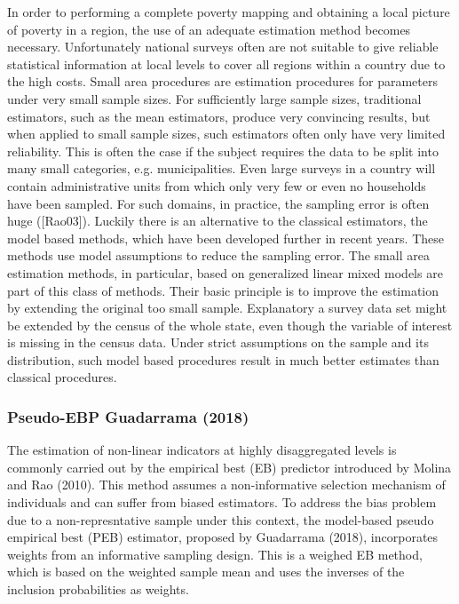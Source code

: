 \documentclass[a4paper, 11pt]{article}
\begin{document}
In order to performing a complete poverty mapping and obtaining a local picture of
poverty in a region, the use of an adequate estimation method becomes necessary.
Unfortunately national surveys often are not suitable to give reliable statistical information
at local levels to cover all regions within a country due to the high costs.
Small area procedures are estimation procedures for parameters under very small
sample sizes. For sufficiently large sample sizes, traditional estimators, such as the
mean estimators, produce very convincing results, but when applied to small sample
sizes, such estimators often only have very limited reliability. This is often the case
if the subject requires the data to be split into many small categories, e.g. municipalities.
Even large surveys in a country will contain administrative units from
which only very few or even no households have been sampled. For such domains, in
practice, the sampling error is often huge ([Rao03]). Luckily there is an alternative
to the classical estimators, the model based methods, which have been developed
further in recent years. These methods use model assumptions to reduce the sampling
error. The small area estimation methods, in particular, based on generalized
linear mixed models are part of this class of methods. Their basic principle is to
improve the estimation by extending the original too small sample. Explanatory a
survey data set might be extended by the census of the whole state, even though
the variable of interest is missing in the census data. Under strict assumptions on the sample and its distribution, such model based procedures result
in much better estimates than classical procedures.
    
\subsubsection{Pseudo-EBP Guadarrama (2018)}

The estimation of non-linear indicators at highly disaggregated levels is commonly carried out by the empirical best (EB) predictor introduced by Molina and Rao (2010). This method assumes a non-informative selection mechanism of individuals and can suffer from biased estimators. To address the bias problem due to a non-represntative sample under this context, the model-based pseudo empirical best (PEB) estimator, proposed by Guadarrama (2018), incorporates weights from an informative sampling design. This is a weighed EB method, which is based on the weighted sample mean and uses the inverses of the inclusion probabilities as weights.  
\end{document}

